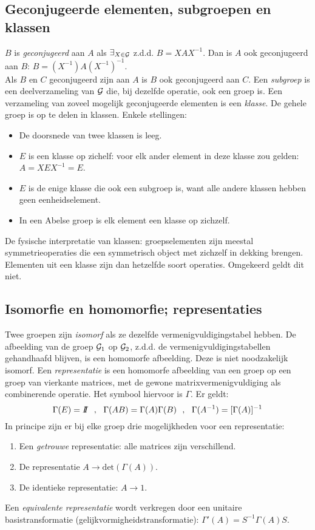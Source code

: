 \subsection{Geconjugeerde elementen, subgroepen en klassen}
$B$ is {\it geconjugeerd} aan $A$ als $\exists_{X\in{\cal{G}}}$ z.d.d. $B=XAX^{-1}$.
Dan is $A$ ook geconjugeerd aan $B$: $B=(X^{-1})A(X^{-1})^{-1}$.\\
Als $B$ en $C$ geconjugeerd zijn aan $A$ is $B$ ook geconjugeerd aan $C$.
\npar
Een {\it subgroep} is een deelverzameling van ${\cal{G}}$ die, bij dezelfde operatie,
ook een groep is.
\npar
Een verzameling van zoveel mogelijk geconjugeerde elementen is een {\it klasse}.
De gehele groep is op te delen in klassen. Enkele stellingen:
\begin{itemize}
\item De doorsnede van twee klassen is leeg.
\item $E$ is een klasse op zichelf: voor elk ander element in deze klasse zou gelden:\\
      $A=XEX^{-1}=E$.
\item $E$ is de enige klasse die ook een subgroep is, want alle andere klassen hebben
      geen eenheidselement.
\item In een Abelse groep is elk element een klasse op zichzelf.
\end{itemize}
De fysische interpretatie van klassen: groepselementen zijn meestal symmetrieoperaties
die een symmetrisch object met zichzelf in dekking brengen. Elementen uit een
klasse zijn dan hetzelfde soort operaties. Omgekeerd geldt dit niet.

\subsection{Isomorfie en homomorfie; representaties}
Twee groepen zijn {\it isomorf} als ze dezelfde vermenigvuldigingstabel hebben.
De afbeelding van de groep ${\cal{G}}_1$ op ${\cal{G}}_2$, z.d.d. de vermenigvuldigingstabellen
gehandhaafd blijven, is een homomorfe afbeelding. Deze is niet noodzakelijk
isomorf.
\npar
Een {\it representatie} is een homomorfe afbeelding van een groep op een groep
van vierkante matrices, met de gewone matrixvermenigvuldiging als combinerende
operatie. Het symbool hiervoor is $\Gamma$. Er geldt:
\[
\Gamma(E)=I\hspace{-0.8ex}I~~,~~\Gamma(AB)=\Gamma(A)\Gamma(B)~~,~~
\Gamma(A^{-1})=[\Gamma(A)]^{-1}
\]
In principe zijn er bij elke groep drie mogelijkheden voor een representatie:
\begin{enumerate}
\item Een {\it getrouwe} representatie: alle matrices zijn verschillend.
\item De representatie $A\rightarrow \mbox{det}(\Gamma(A))$.
\item De identieke representatie: $A\rightarrow1$.
\end{enumerate}
Een {\it equivalente representatie} wordt verkregen door een unitaire basistransformatie
(gelijkvormigheidstransformatie): $\Gamma'(A)=S^{-1}\Gamma(A)S$.

